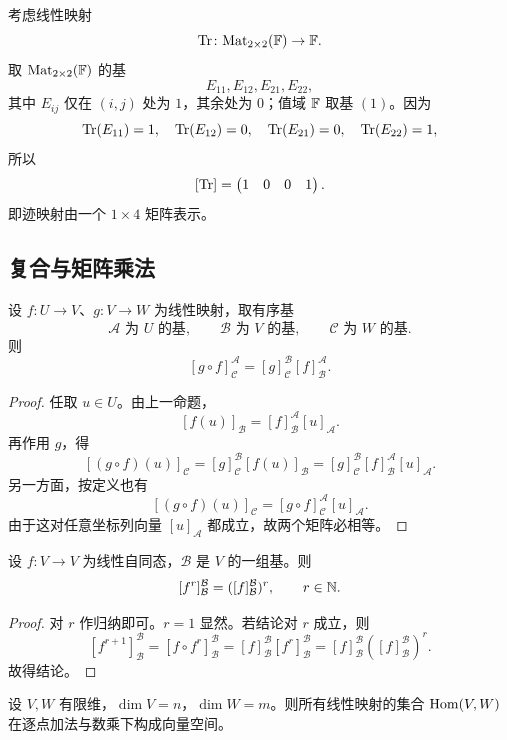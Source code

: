 \begin{example}[迹映射的矩阵]
考虑线性映射
\[
  \mathrm{Tr}\colon \mathrm{Mat}_{2\times 2}(\mathbb{F})\to \mathbb{F}.
\]
取 $\mathrm{Mat}_{2\times 2}(\mathbb{F})$ 的基
\[
  E_{11},E_{12},E_{21},E_{22},
\]
其中 $E_{ij}$ 仅在 $(i,j)$ 处为 $1$，其余处为 $0$；值域 $\mathbb{F}$ 取基 $(1)$。因为
\[
  \mathrm{Tr}(E_{11})=1,\quad \mathrm{Tr}(E_{12})=0,\quad \mathrm{Tr}(E_{21})=0,\quad \mathrm{Tr}(E_{22})=1,
\]
所以
\[
  [\mathrm{Tr}]=\begin{pmatrix} 1 & 0 & 0 & 1 \end{pmatrix}.
\]
即迹映射由一个 $1\times 4$ 矩阵表示。
\end{example}

\subsection{复合与矩阵乘法}

\begin{theorem}
设 $f\colon U\to V$、$g\colon V\to W$ 为线性映射，取有序基
\[
  \mathcal A\text{ 为 }U\text{ 的基},\qquad
  \mathcal B\text{ 为 }V\text{ 的基},\qquad
  \mathcal C\text{ 为 }W\text{ 的基}.
\]
则
\[
  [g\circ f]_{\mathcal C}^{\mathcal A}
  =[g]_{\mathcal C}^{\mathcal B}[f]_{\mathcal B}^{\mathcal A}.
\]
\end{theorem}

\begin{proof}
任取 $u\in U$。由上一命题，
\[
  [f(u)]_{\mathcal B}=[f]_{\mathcal B}^{\mathcal A}[u]_{\mathcal A}.
\]
再作用 $g$，得
\[
  [(g\circ f)(u)]_{\mathcal C}
  =[g]_{\mathcal C}^{\mathcal B}[f(u)]_{\mathcal B}
  =[g]_{\mathcal C}^{\mathcal B}[f]_{\mathcal B}^{\mathcal A}[u]_{\mathcal A}.
\]
另一方面，按定义也有
\[
  [(g\circ f)(u)]_{\mathcal C}
  =[g\circ f]_{\mathcal C}^{\mathcal A}[u]_{\mathcal A}.
\]
由于这对任意坐标列向量 $[u]_{\mathcal A}$ 都成立，故两个矩阵必相等。
\end{proof}

\begin{corollary}
设 $f\colon V\to V$ 为线性自同态，$\mathcal B$ 是 $V$ 的一组基。则
\[
  [f^r]_{\mathcal B}^{\mathcal B}=([f]_{\mathcal B}^{\mathcal B})^r,
  \qquad r\in\mathbb{N}.
\]
\end{corollary}

\begin{proof}
对 $r$ 作归纳即可。$r=1$ 显然。若结论对 $r$ 成立，则
\[
  [f^{r+1}]_{\mathcal B}^{\mathcal B}
  =[f\circ f^r]_{\mathcal B}^{\mathcal B}
  =[f]_{\mathcal B}^{\mathcal B}[f^r]_{\mathcal B}^{\mathcal B}
  =[f]_{\mathcal B}^{\mathcal B}([f]_{\mathcal B}^{\mathcal B})^r.
\]
故得结论。
\end{proof}

\begin{proposition}
设 $V,W$ 有限维，$\dim V=n$，$\dim W=m$。则所有线性映射的集合 $\mathrm{Hom}(V,W)$ 在逐点加法与数乘下构成向量空间。
\end{proposition}

